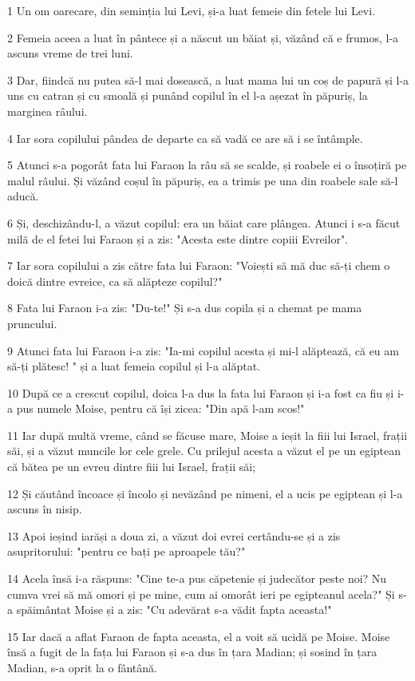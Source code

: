 \par 1 Un om oarecare, din seminția lui Levi, și-a luat femeie din fetele lui Levi.
\par 2 Femeia aceea a luat în pântece și a născut un băiat și, văzând că e frumos, l-a ascuns vreme de trei luni.
\par 3 Dar, fiindcă nu putea să-l mai dosească, a luat mama lui un coș de papură și l-a uns cu catran și cu smoală și punând copilul în el l-a așezat în păpuriș, la marginea râului.
\par 4 Iar sora copilului pândea de departe ca să vadă ce are să i se întâmple.
\par 5 Atunci s-a pogorât fata lui Faraon la râu să se scalde, și roabele ei o însoțiră pe malul râului. Și văzând coșul în păpuriș, ea a trimis pe una din roabele sale să-l aducă.
\par 6 Și, deschizându-l, a văzut copilul: era un băiat care plângea. Atunci i s-a făcut milă de el fetei lui Faraon și a zis: "Acesta este dintre copiii Evreilor".
\par 7 Iar sora copilului a zis către fata lui Faraon: "Voiești să mă duc să-ți chem o doică dintre evreice, ca să alăpteze copilul?"
\par 8 Fata lui Faraon i-a zis: "Du-te!" Și s-a dus copila și a chemat pe mama pruncului.
\par 9 Atunci fata lui Faraon i-a zis: "Ia-mi copilul acesta și mi-l alăptează, că eu am să-ți plătesc! " și a luat femeia copilul și l-a alăptat.
\par 10 După ce a crescut copilul, doica l-a dus la fata lui Faraon și i-a fost ca fiu și i-a pus numele Moise, pentru că își zicea: "Din apă l-am scos!"
\par 11 Iar după multă vreme, când se făcuse mare, Moise a ieșit la fiii lui Israel, frații săi, și a văzut muncile lor cele grele. Cu prilejul acesta a văzut el pe un egiptean că bătea pe un evreu dintre fiii lui Israel, frații săi;
\par 12 Și căutând încoace și încolo și nevăzând pe nimeni, el a ucis pe egiptean și l-a ascuns în nisip.
\par 13 Apoi ieșind iarăși a doua zi, a văzut doi evrei certându-se și a zis asupritorului: "pentru ce bați pe aproapele tău?"
\par 14 Acela însă i-a răspuns: "Cine te-a pus căpetenie și judecător peste noi? Nu cumva vrei să mă omori și pe mine, cum ai omorât ieri pe egipteanul acela?" Și s-a spăimântat Moise și a zis: "Cu adevărat s-a vădit fapta aceasta!"
\par 15 Iar dacă a aflat Faraon de fapta aceasta, el a voit să ucidă pe Moise. Moise însă a fugit de la fața lui Faraon și s-a dus în țara Madian; și sosind în țara Madian, s-a oprit la o fântână.
